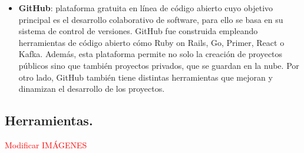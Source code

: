 \begin{itemize}
\item \textbf{GitHub}\cite{GitHub}: plataforma gratuita en línea de código abierto cuyo objetivo principal es el desarrollo colaborativo de software, para ello se basa en su sistema de control de versiones. GitHub fue construida empleando herramientas de código abierto cómo  Ruby on Rails, Go, Primer, React o Kafka. Además, esta plataforma permite no solo la creación de proyectos públicos sino que también proyectos privados, que se guardan en la nube. Por otro lado, GitHub también tiene distintas herramientas que mejoran y dinamizan el desarrollo de los proyectos.


\end{itemize}

\subsection{Herramientas.}
\textcolor{red}{Modificar IMÁGENES}
